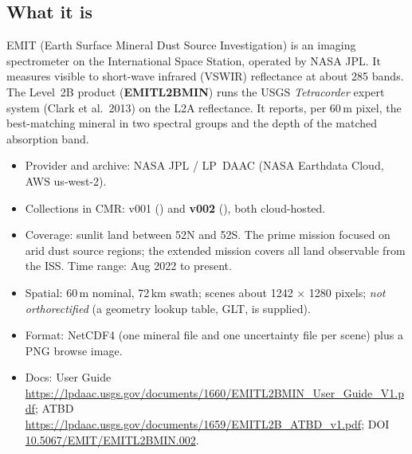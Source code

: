 \documentclass[10pt,a4paper]{article}
\begin{document}
\subsection{What it is}
EMIT (Earth Surface Mineral Dust Source Investigation) is an imaging spectrometer on the International Space Station, operated by NASA JPL. It measures visible to short-wave infrared (VSWIR) reflectance at about 285 bands. The Level~2B product (\textbf{EMITL2BMIN}) runs the USGS \emph{Tetracorder} expert system (Clark et al.\ 2013) on the L2A reflectance. It reports, per 60\,m pixel, the best-matching mineral in two spectral groups and the depth of the matched absorption band.
\begin{itemize}
\item Provider and archive: NASA JPL / LP~DAAC (NASA Earthdata Cloud, AWS us-west-2).
\item Collections in CMR:  v001 () and \textbf{v002} (), both cloud-hosted.
\item Coverage: sunlit land between 52\textdegree N and 52\textdegree S. The prime mission focused on arid dust source regions; the extended mission covers all land observable from the ISS. Time range: Aug 2022 to present.
\item Spatial: 60\,m nominal, 72\,km swath; scenes about 1242 $\times$ 1280 pixels; \emph{not orthorectified} (a geometry lookup table, GLT, is supplied).
\item Format: NetCDF4 (one mineral file and one uncertainty file per scene) plus a PNG browse image.
\item Docs: User Guide \url{https://lpdaac.usgs.gov/documents/1660/EMITL2BMIN_User_Guide_V1.pdf}; ATBD \url{https://lpdaac.usgs.gov/documents/1659/EMITL2B_ATBD_v1.pdf}; DOI \href{https://doi.org/10.5067/EMIT/EMITL2BMIN.002}{10.5067/EMIT/EMITL2BMIN.002}.
\end{itemize}
\end{document}
